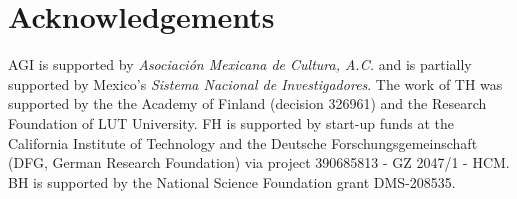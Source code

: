 \documentclass[final]{siamart171218}
\begin{document}
\section{Acknowledgements}
AGI is supported by {\it Asociación Mexicana de Cultura, A.C.} and is partially supported by Mexico's {\it Sistema Nacional de Investigadores}. The work of TH was supported by the the Academy of Finland (decision 326961) and the Research Foundation of LUT University. 
FH is supported by start-up funds at the California Institute of Technology and the Deutsche Forschungsgemeinschaft (DFG, German Research Foundation) via project 390685813 - GZ 2047/1 - HCM.
BH is supported by the National Science Foundation grant DMS-208535.  




\appendix
\end{document}
